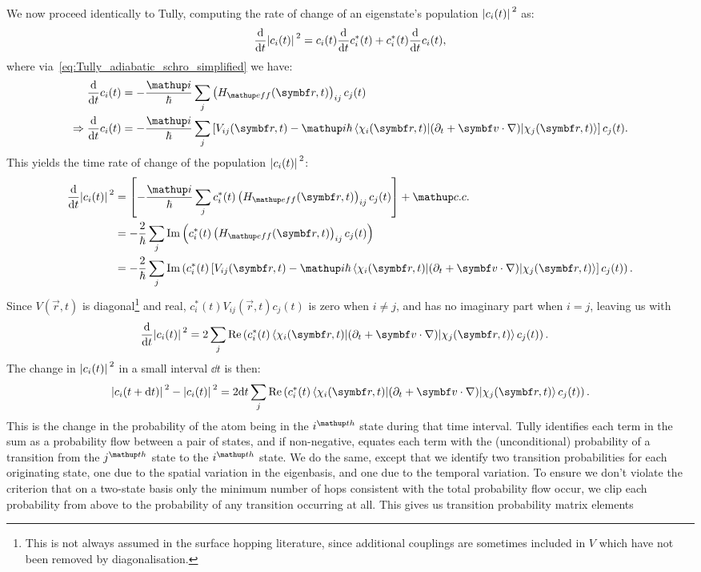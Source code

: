 We now proceed identically to Tully, computing the rate of change of an eigenstate's population $\abs{c_i(t)}^2$ as:
\begin{align}
\dv{t}\abs{c_i(t)}^2 = c_i(t) \dv{t}c_i^*(t) + c_i^*(t) \dv{t}c_i(t),
\end{align}
where via~\eqref{eq:Tully_adiabatic_schro_simplified} we have:
\begin{align}
\dv{t}c_i(t) &= -\frac\ii\hbar\sum_j \left(H_\up{eff}(\vec r, t)\right)_{ij} c_j(t)\\
\Rightarrow \dv{t}c_i(t) &= -\frac\ii\hbar \sum_j\left[V_{ij}(\vec r, t)
  - \ii\hbar\matrixel{\chi_i(\vec r, t)}{(\partial_t + \vec v\cdot\nabla)}{\chi_j(\vec r, t)}
 \right] c_j(t).
\end{align}
This yields the time rate of change of the population $\abs{c_i(t)}^2$:
\begin{align}
\dv{t}\abs{c_i(t)}^2 &= \left[-\frac\ii\hbar \sum_j c_i^*(t) \left(H_\up{eff}(\vec r, t)\right)_{ij} c_j(t)\right] + \up{c.c.}\\
&= -\frac2\hbar\sum_j\im\left(c_i^*(t) \left(H_\up{eff}(\vec r, t)\right)_{ij} c_j(t)\right)\label{eq:fewest_switches_Heff}\\
&= -\frac2\hbar\sum_j\im\left(c_i^*(t)
\left[V_{ij}(\vec r, t)
  - \ii\hbar\matrixel{\chi_i(\vec r, t)}{(\partial_t + \vec v\cdot\nabla)}{\chi_j(\vec r, t)}
 \right]
 c_j(t)\right).
\end{align}
Since $V(\vec r, t)$ is diagonal\footnote{This is not always assumed in the surface hopping literature, since additional couplings are sometimes included in $V$ which have not been removed by diagonalisation.} and real, $c_i^*(t)V_{ij}(\vec r, t)c_j(t)$ is zero when $i\neq j$, and has no imaginary part when $i=j$, leaving us with
\begin{align}
\dv{t}\abs{c_i(t)}^2 &= 2\sum_j\re\left(c_i^*(t)
  \matrixel{\chi_i(\vec r, t)}{(\partial_t + \vec v\cdot\nabla)}{\chi_j(\vec r, t)}
 c_j(t)\right).
\end{align}
The change in $\abs{c_i(t)}^2$ in a small interval $\dd t$ is then:
\begin{align}\label{eq:Tully_change_in_prob}
\abs{c_i(t + \dd t)}^2 - \abs{c_i(t)}^2 = 2\dd t
\sum_j\re\left(c_i^*(t)
  \matrixel{\chi_i(\vec r, t)}{(\partial_t + \vec v\cdot\nabla)}{\chi_j(\vec r, t)}
 c_j(t)\right).
\end{align}
This is the change in the probability of the atom being in the $i^\up{th}$ state during that time interval. Tully identifies each term in the sum as a probability flow between a pair of states, and if non-negative, equates each term with the (unconditional) probability of a transition from the $j^\up{th}$ state to the $i^\up{th}$ state. We do the same, except that we identify two transition probabilities for each originating state, one due to the spatial variation in the eigenbasis, and one due to the temporal variation. To ensure we don't violate the criterion that on a two-state basis only the minimum number of hops consistent with the total probability flow occur, we clip each probability from above to the probability of any transition occurring at all. This gives us transition probability matrix elements
